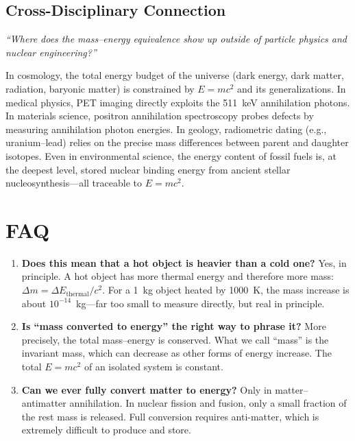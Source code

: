 \subsection*{Cross-Disciplinary Connection}
\textit{``Where does the mass--energy equivalence show up outside of particle physics and nuclear engineering?''}

In cosmology, the total energy budget of the universe (dark energy, dark matter, radiation, baryonic matter) is constrained by $E = mc^{2}$ and its generalizations. In medical physics, PET imaging directly exploits the 511~keV annihilation photons. In materials science, positron annihilation spectroscopy probes defects by measuring annihilation photon energies. In geology, radiometric dating (e.g., uranium--lead) relies on the precise mass differences between parent and daughter isotopes. Even in environmental science, the energy content of fossil fuels is, at the deepest level, stored nuclear binding energy from ancient stellar nucleosynthesis---all traceable to $E = mc^{2}$.

\section*{FAQ}

\begin{enumerate}
\item \textbf{Does this mean that a hot object is heavier than a cold one?}
Yes, in principle. A hot object has more thermal energy and therefore more mass: $\Delta m = \Delta E_{\text{thermal}}/c^{2}$. For a 1~kg object heated by 1000~K, the mass increase is about $10^{-14}$~kg---far too small to measure directly, but real in principle.

\item \textbf{Is ``mass converted to energy'' the right way to phrase it?}
More precisely, the total mass--energy is conserved. What we call ``mass'' is the invariant mass, which can decrease as other forms of energy increase. The total $E = mc^{2}$ of an isolated system is constant.

\item \textbf{Can we ever fully convert matter to energy?}
Only in matter--antimatter annihilation. In nuclear fission and fusion, only a small fraction of the rest mass is released. Full conversion requires anti-matter, which is extremely difficult to produce and store.
\end{enumerate}
